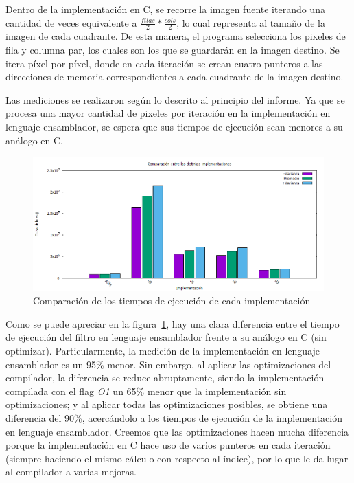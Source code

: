 \documentclass[a4paper]{article}
\begin{document}
Dentro de la implementación en C, se recorre la imagen fuente iterando una cantidad de veces equivalente a $\frac{filas}{2} * \frac{cols}{2}$, lo cual representa al tamaño de la imagen de cada cuadrante. De esta manera, el programa selecciona los pixeles de fila y columna par, los cuales son los que se guardarán en la imagen destino. Se itera píxel por píxel, donde en cada iteración se crean cuatro punteros a las direcciones de memoria correspondientes a cada cuadrante de la imagen destino.

Las mediciones se realizaron según lo descrito al principio del informe. Ya que se procesa una mayor cantidad de pixeles por iteración en la implementación en lenguaje ensamblador, se espera que sus tiempos de ejecución sean menores a su análogo en C.
\\
\begin{figure}[H]
  \begin{center}
	\includegraphics[scale=0.66]{imagenes/smalltilesC.png}
	\caption{Comparación de los tiempos de ejecución de cada implementación}
	\label{smalltiles_asmvsc}
  \end{center}
\end{figure}

Como se puede apreciar en la figura~\ref{smalltiles_asmvsc}, hay una clara diferencia entre el tiempo de ejecución del filtro en lenguaje ensamblador frente a su análogo en C (sin optimizar). Particularmente, la medición de la implementación en lenguaje ensamblador es un 95\% menor. Sin embargo, al aplicar las optimizaciones del compilador, la diferencia se reduce abruptamente, siendo la implementación compilada con el flag \textit{O1} un 65\% menor que la implementación sin optimizaciones; y al aplicar todas las optimizaciones posibles, se obtiene una diferencia del 90\%, acercándolo a los tiempos de ejecución de la implementación en lenguaje ensamblador. Creemos que las optimizaciones hacen mucha diferencia porque la implementación en C hace uso de varios punteros en cada iteración (siempre haciendo el mismo cálculo con respecto al índice), por lo que le da lugar al compilador a varias mejoras.
\end{document}
